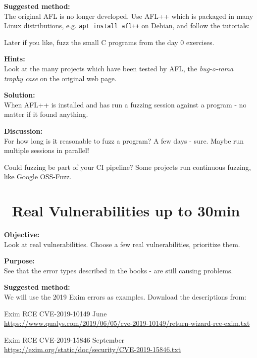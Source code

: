 \documentclass[a4paper,11pt,notitlepage]{report}
\begin{document}
{\bf Suggested method:}\\
The original AFL is no longer developed. Use AFL++ which is packaged in many Linux distributions, e.g. \verb|apt install afl++| on Debian, and follow the tutorials:\\

Later if you like, fuzz the small C programs from the day 0 exercises.

{\bf Hints:}\\
Look at the many projects which have been tested by AFL, the \emph{bug-o-rama trophy case} on the original web page.

{\bf Solution:}\\
When AFL++ is installed and has run a fuzzing session against a program - no matter if it found anything.

{\bf Discussion:}\\
For how long is it reasonable to fuzz a program? A few days - sure. Maybe run multiple sessions in parallel!

Could fuzzing be part of your CI pipeline? Some projects run continuous fuzzing, like Google OSS-Fuzz.


\chapter{\faInfoCircle\ Real Vulnerabilities up to 30min}
\label{ex:real-vulns}

{\bf Objective:}\\
Look at real vulnerabilities. Choose a few real vulnerabilities, prioritize them.

{\bf Purpose:}\\
See that the error types described in the books - are still causing problems.

{\bf Suggested method:}\\
We will use the 2019 Exim errors as examples. Download the descriptions from:
\begin{list2}
\item Exim RCE CVE-2019-10149 June\\ \url{https://www.qualys.com/2019/06/05/cve-2019-10149/return-wizard-rce-exim.txt}

\item Exim RCE CVE-2019-15846 September\\
\url{https://exim.org/static/doc/security/CVE-2019-15846.txt}
\end{list2}
\end{document}
